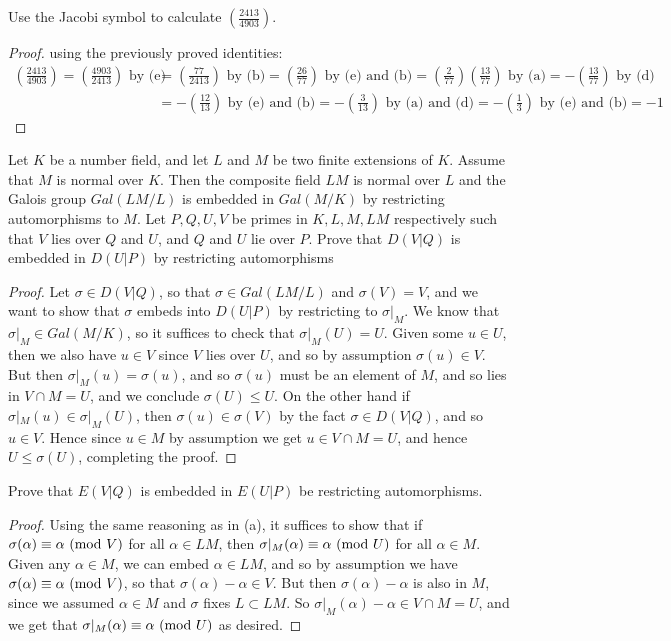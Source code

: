 \documentclass[11pt]{article}
\newcommand{\legendre}[2]{\genfrac{(}{)}{}{}{#1}{#2}}
\begin{document}
Use the Jacobi symbol to calculate $\legendre{2413}{4903}$.
\begin{proof}
  using the previously proved identities:
  \begin{align*}
    \legendre{2413}{4903}
    = \legendre{4903}{2413} \text{ by (e)} 
    &= \legendre{77}{2413} \text{ by (b)} 
    = \legendre{26}{77} \text{ by (e) and (b)}
    = \legendre{2}{77} \legendre{13}{77} \text{ by (a)} 
    = - \legendre{13}{77} \text{ by (d)} \\
    &= - \legendre{12}{13} \text{ by (e) and (b)} 
    = - \legendre{3}{13} \text{ by (a) and (d)} 
    = - \legendre{1}{3} \text{ by (e) and (b)} 
    = -1
  \end{align*}
\end{proof}


Let $K$ be a number field, and let $L$ and $M$ be two finite extensions of $K$.
Assume that $M$ is normal over $K$.
Then the composite field $LM$ is normal over $L$ and the Galois group $Gal(LM/L)$ is embedded in $Gal(M/K)$ by restricting automorphisms to $M$.
Let $P, Q, U, V$ be primes in $K, L, M, LM$ respectively such that $V$ lies over $Q$ and $U$, and $Q$ and $U$ lie over $P$.
Prove that $D(V|Q)$ is embedded in $D(U|P)$ by restricting automorphisms
\begin{proof}
  Let $\sigma \in D(V|Q)$, so that $\sigma \in Gal(LM/L)$ and $\sigma(V) = V$, and we want  to show that $\sigma$ embeds into $D(U|P)$ by restricting to $\sigma|_M$.
  We know that $\sigma|_M \in Gal(M/K)$, so it suffices to check that $\sigma|_M(U) = U$.
  Given some $u \in U$, then we also have $u \in V$ since $V$ lies over $U$, and so by assumption $\sigma(u) \in V$.
  But then $\sigma|_M(u) = \sigma(u)$, and so $\sigma(u)$ must be an element of $M$, and so lies in $V \cap M = U$, and we conclude $\sigma(U) \le U$.
  On the other hand if $\sigma|_M(u) \in \sigma|_M(U)$, then $\sigma(u) \in \sigma(V)$ by the fact $\sigma \in D(V|Q)$, and so $u \in V$.
  Hence since $u \in M$ by assumption we get $u \in V \cap M = U$, and hence $U \le \sigma(U)$, completing the proof.
\end{proof}

Prove that $E(V|Q)$ is embedded in $E(U|P)$ be restricting automorphisms.
\begin{proof}
  Using the same reasoning as in (a), it suffices to show that if $\sigma(\alpha) \equiv \alpha\ (\text{mod}\ V)$ for all $\alpha \in LM$, then $\sigma|_M(\alpha) \equiv \alpha\ (\text{mod}\ U)$ for all $\alpha \in M$.
  Given any $\alpha \in M$, we can embed $\alpha \in LM$, and so by assumption we have $\sigma(\alpha) \equiv \alpha\ (\text{mod}\ V)$, so that $\sigma(\alpha) - \alpha \in V$.
  But then $\sigma(\alpha) - \alpha$ is also in $M$, since we assumed $\alpha \in M$ and $\sigma$ fixes $L \subset LM$.
  So $\sigma|_M(\alpha) - \alpha \in V \cap M = U$, and we get that $\sigma|_M(\alpha) \equiv \alpha\ (\text{mod}\ U)$ as desired.
\end{proof}
\end{document}
